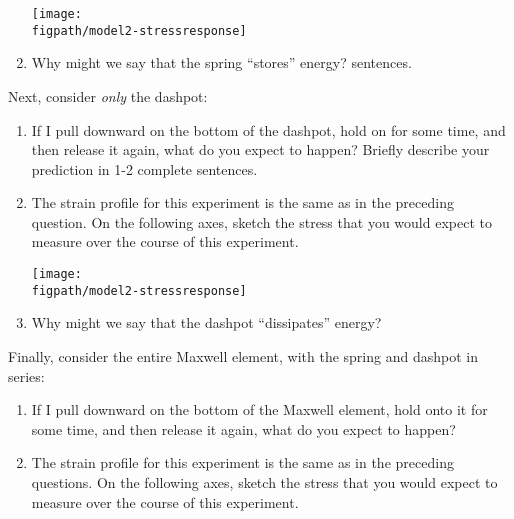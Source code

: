 \begin{activity}
\begin{ctqs}
\begin{enumerate}
					\centerline{\texttt{[image: \\figpath/model2-stressresponse]}}
				
				\item Why might we say that the spring ``stores'' energy? sentences.
	
					\begin{solution}[1.5in]
					\end{solution}
			\end{enumerate}
			
		
		\question Next, consider \emph{only} the dashpot:
		
			\begin{enumerate}
				\item If I pull downward on the bottom of the dashpot, hold on for some time, and then release it again, what do you expect to happen?  Briefly describe your prediction in 1-2 complete sentences.
	
					\begin{solution}[1.5in]
					\end{solution}
				
				\item The strain profile for this experiment is the same as in the preceding question.  On the following axes, sketch the stress that you would expect to measure over the course of this experiment.
				
					\centerline{\texttt{[image: \\figpath/model2-stressresponse]}}
				
				\item Why might we say that the dashpot ``dissipates'' energy?
	
					\begin{solution}[1.5in]
					\end{solution}
			\end{enumerate}
			
		\question Finally, consider the entire Maxwell element, with the spring and dashpot in series:
		
			\begin{enumerate}
				\item If I pull downward on the bottom of the Maxwell element, hold onto it for some time, and then release it again, what do you expect to happen?
	
					\begin{solution}[1.5in]
					\end{solution}
				
				\item The strain profile for this experiment is the same as in the preceding questions.  On the following axes, sketch the stress that you would expect to measure over the course of this experiment.
				

\end{enumerate}
\end{ctqs}
\end{activity}
